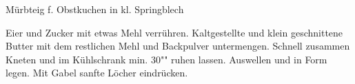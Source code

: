 \begin{MyRecipe}{Mürbteig f. Obstkuchen in kl. Springblech}{}{}
	
	Eier und Zucker mit etwas Mehl verrühren. Kaltgestellte und klein geschnittene Butter mit dem restlichen Mehl und Backpulver untermengen. Schnell zusammen Kneten und im Kühlschrank min. 30"" ruhen lassen. Auswellen und in Form legen. Mit Gabel sanfte Löcher eindrücken.
	
\end{MyRecipe}